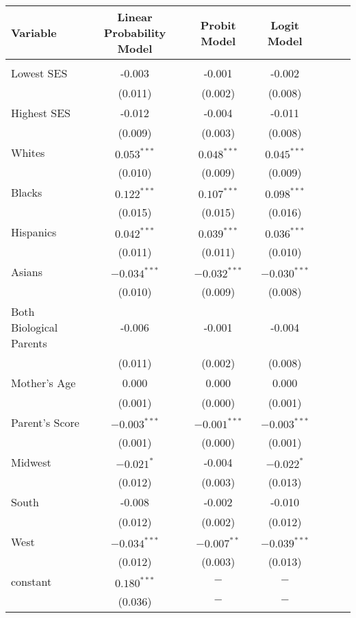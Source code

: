 \documentclass{article}
\begin{document}
\begin{table}[H]
\begin{threeparttable}
		\begin{tabular}{l*{6}{c}}
\hline\hline
Variable & Linear Probability Model& Probit Model & Logit Model  \\
\hline & & & \\
Lowest SES & -0.003 &  -0.001 & -0.002 \\
& (0.011) & (0.002) & (0.008) \\
Highest SES & -0.012 & -0.004 & -0.011 \\
& (0.009) & (0.003) & (0.008) \\
Whites & $0.053^{***}$ & $0.048^{***}$ & $0.045^{***}$ \\
& (0.010) & (0.009) & (0.009) \\
Blacks & $0.122^{***}$ &  $0.107^{***}$ & $0.098^{***}$ \\
& (0.015) & (0.015) & (0.016) \\
Hispanics & $0.042^{***}$ & $0.039^{***}$ & $0.036^{***}$ \\
& (0.011) & (0.011) & (0.010) \\
Asians & $-0.034^{***}$ & $-0.032^{***}$ & $-0.030^{***}$ \\
& (0.010) & (0.009) & (0.008) \\
Both Biological Parents & -0.006 & -0.001 & -0.004 \\
& (0.011) & (0.002) & (0.008) \\
Mother's Age & 0.000 & 0.000 & 0.000 \\
& (0.001) & (0.000) & (0.001) \\
Parent's Score & $-0.003^{***}$ & $-0.001^{***}$ & $-0.003^{***}$ \\
& (0.001) & (0.000) & (0.001) \\
Midwest & $-0.021^{*}$ & -0.004 & $-0.022^{*}$ \\
& (0.012) & (0.003) & (0.013) \\
South & -0.008 & -0.002 & -0.010 \\
& (0.012) & (0.002) & (0.012) \\
West & $-0.034^{***}$ & $-0.007^{**}$ & $-0.039^{***}$ \\
& (0.012) & (0.003) & (0.013) \\
constant & $0.180^{***}$ & $-$ & $-$ \\
& (0.036) & $-$ & $-$ \\

\hline 

		\end{tabular}
		
\begin{tablenotes}[flushleft]


\end{tablenotes}
\end{threeparttable}
\end{table}
\end{document}
